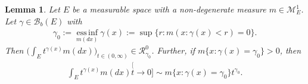 \documentclass[12pt,a4paper]{amsart}
\newtheorem{lem}[thm]{Lemma}
\theoremstyle{definition}
\numberwithin{equation}{section}
\begin{document}
\begin{lem}\label{lem:regularly_variation_and_integration}
	Let $E$ be a measurable space with a non-degenerate measure $m \in \mathcal M^1_E$.
	Let $ \gamma \in \mathscr B_b(E)$ with
  \begin{align}
    \gamma_0
    := \operatorname*{ess\,inf}_{m(dx)} \gamma(x)
    := \sup\{r:m(x:\gamma(x) < r) = 0\}.
  \end{align}
	Then $\big(\int_E t^{\gamma(x)} m(dx)\big)_{t\in (0,\infty)} \in \mathcal R^0_{\gamma_0}$.
	Further, if $m\{x:\gamma(x) = \gamma_0\}>0$, then
\begin{align}
	\int_E t^{\gamma(x)} m(dx)
	\stackrel[t\to 0]{}{\sim}  m\{x:\gamma(x) = \gamma_0\} t^{\gamma_0}.
\end{align}
\end{lem}
\end{document}
